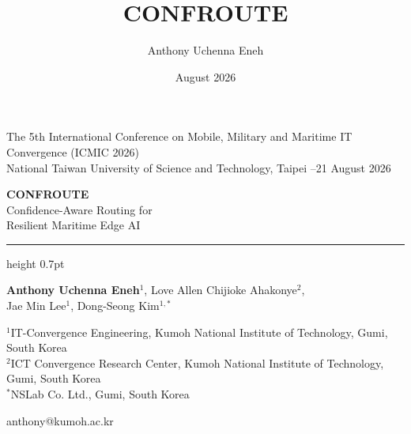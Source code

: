 \documentclass[aspectratio=169, 11pt]{beamer}
\title{CONFROUTE}
\author{Anthony Uchenna Eneh}
\date{August 2026}
\begin{document}
{
\begin{frame}[plain]
  \vspace{0.9em}
  {\color{muted}\footnotesize The 5th International Conference on Mobile, Military and Maritime IT Convergence (ICMIC 2026)\\
   National Taiwan University of Science and Technology, Taipei \quad\textbar{}--21 August 2026}

  \vspace{1.6em}
  {\color{navy}\huge\bfseries CONFROUTE}\\[0.35em]
  {\color{ink}\Large Confidence-Aware Routing for\\[0.15em] Resilient Maritime Edge AI}

  \vspace{1.3em}
  {\color{rule}\hrule height 0.7pt}
  \vspace{1.0em}

  {\normalsize \textbf{Anthony Uchenna Eneh}$^{1}$, \enspace Love Allen Chijioke Ahakonye$^{2}$,\\[0.2em]
   Jae Min Lee$^{1}$, \enspace Dong-Seong Kim$^{1,\ast}$}

  \vspace{0.7em}
  {\color{ink2}\footnotesize
   $^{1}$IT-Convergence Engineering, Kumoh National Institute of Technology, Gumi, South Korea\\
   $^{2}$ICT Convergence Research Center, Kumoh National Institute of Technology, Gumi, South Korea\\
   $^{\ast}$NSLab Co. Ltd., Gumi, South Korea}

  \vfill
  {\color{muted}\scriptsize anthony@kumoh.ac.kr}
  \vspace{0.4em}
\end{frame}}
\end{document}
